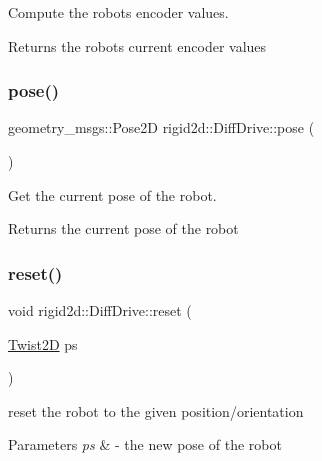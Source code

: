 Compute the robot\textquotesingle{}s encoder values. 

\begin{DoxyReturn}{Returns}
the robot\textquotesingle{}s current encoder values 
\end{DoxyReturn}
\mbox{\label{classrigid2d_1_1DiffDrive_ae4d0c4e53e8558fed8c7711724f585d3}} 
\subsubsection{\texorpdfstring{pose()}{pose()}}
{\footnotesize\ttfamily geometry\+\_\+msgs\+::\+Pose2D rigid2d\+::\+Diff\+Drive\+::pose (\begin{DoxyParamCaption}{ }\end{DoxyParamCaption})}



Get the current pose of the robot. 

\begin{DoxyReturn}{Returns}
the current pose of the robot 
\end{DoxyReturn}
\mbox{\label{classrigid2d_1_1DiffDrive_a2554a9bce4ecada65a159498a432d444}} 
\subsubsection{\texorpdfstring{reset()}{reset()}}
{\footnotesize\ttfamily void rigid2d\+::\+Diff\+Drive\+::reset (\begin{DoxyParamCaption}\item[{\hyperlink{classrigid2d_1_1Twist2D}{Twist2D}}]{ps }\end{DoxyParamCaption})}



reset the robot to the given position/orientation 


\begin{DoxyParams}{Parameters}
{\em ps} & -\/ the new pose of the robot \\
\hline
\end{DoxyParams}
\mbox{\label{classrigid2d_1_1DiffDrive_a82198f5be806b6f772a1718f3887f5c9}} 

